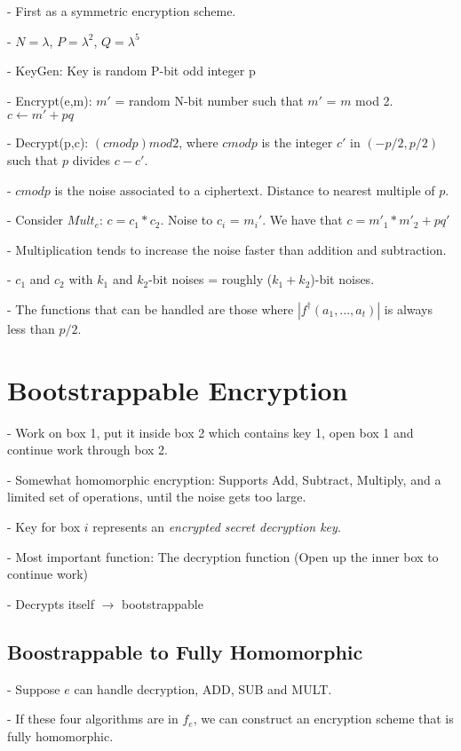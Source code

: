 \documentclass[10pt]{article}
\begin{document}
- First as a symmetric encryption scheme.

- $N = \lambda$, $P = \lambda^{2}$, $Q = \lambda^{5}$

- KeyGen: Key is random P-bit odd integer p

- Encrypt(e,m): $m'$ = random N-bit number such that $m'$ = $m$ mod 2. $c \leftarrow m' + pq$

- Decrypt(p,c): $(c mod p) mod 2$, where $c mod p$ is the integer $c'$ in $(-p/2, p/2)$ such that $p$ divides $c-c'$.

- $c mod p$ is the noise associated to a ciphertext. Distance to nearest multiple of $p$.

- Consider $Mult_e$: $c = c_1 * c_2$. Noise to $c_i$ = $m_i'$. We have that $c = m'_1 * m'_2 + pq'$

- Multiplication tends to increase the noise faster than addition and subtraction.

- $c_1$ and $c_2$ with $k_1$ and $k_2$-bit noises = roughly ($k_1 + k_2$)-bit noises.

- The functions that can be handled are those where $|f^{\dagger}(a_1,...,a_t)|$ is always less than $p/2$.

\section{Bootstrappable Encryption}

- Work on box 1, put it inside box 2 which contains key 1, open box 1 and continue work through box 2.

- Somewhat homomorphic encryption: Supports Add, Subtract, Multiply, and a limited set of operations, until the noise gets too large.

- Key for box $i$ represents an \emph{encrypted secret decryption key}.

- Most important function: The decryption function (Open up the inner box to continue work)

- Decrypts itself $\rightarrow$ bootstrappable

\subsection{Boostrappable to Fully Homomorphic}

- Suppose $e$ can handle decryption, ADD, SUB and MULT.

- If these four algorithms are in $f_e$, we can construct an encryption scheme that is fully homomorphic.
\end{document}
